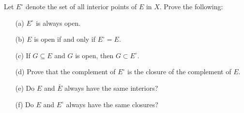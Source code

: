 \documentclass{article}
\begin{document}
    \begin{exercise}[Rudin 2.9]
    Let $E^\circ$ denote the set of all interior points of $E$ in $X$. Prove the following:
    \begin{enumerate}
        \item[(a)] $E^\circ$ is always open.
        \item[(b)] $E$ is open if and only if $E^\circ = E$.
        \item[(c)] If $G \subseteq E$ and $G$ is open, then $G \subset E^\circ$.
        \item[(d)] Prove that the complement of $E^\circ$ is the closure of the complement of $E$. 
        \item[(e)] Do $E$ and $\bar{E}$ always have the same interiors? 
        \item[(f)] Do $E$ and $E^\circ$ always have the same closures? 
    \end{enumerate}
    \end{exercise}
\end{document}
